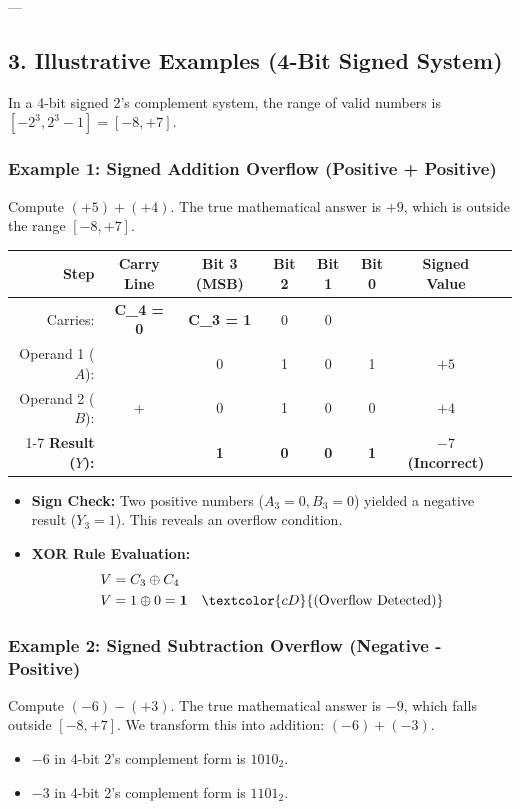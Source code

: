 \documentclass[12pt,a3paper]{article}
\begin{document}
\begin{enumerate}
\begin{tcolorbox}[enhanced,breakable,ansbox,colback=cD!4,colframe=cD,boxrule=0.8pt,arc=5pt,title={\textbf{Answer}},fonttitle=\bfseries\color{white},colbacktitle=cD]
---

\subsection*{3. Illustrative Examples (4-Bit Signed System)}
In a 4-bit signed 2's complement system, the range of valid numbers is $[-2^3, 2^3-1] = [-8, +7]$.

\subsubsection*{Example 1: Signed Addition Overflow (Positive + Positive)}
Compute $(+5) + (+4)$. The true mathematical answer is $+9$, which is outside the range $[ -8, +7 ]$.

\begin{center}
\renewcommand{\arraystretch}{1.1}
\begin{tabular}{rccccccl}
\toprule
\textbf{Step} & \textbf{Carry Line} & \textbf{Bit 3 (MSB)} & \textbf{Bit 2} & \textbf{Bit 1} & \textbf{Bit 0} & \textbf{Signed Value} \\
\midrule
Carries: & \textcolor{cD}{\textbf{C\_4 = 0}} & \textcolor{cD}{\textbf{C\_3 = 1}} & 0 & 0 & & \\
Operand 1 ($A$): & & 0 & 1 & 0 & 1 & $+5$ \\
Operand 2 ($B$): & + & 0 & 1 & 0 & 0 & $+4$ \\
\cmidrule{1-7}
\textbf{Result ($Y$):} & & \textbf{1} & \textbf{0} & \textbf{0} & \textbf{1} & \textbf{$-7$ (Incorrect)} \\
\bottomrule
\end{tabular}
\end{center}

\begin{itemize}
    \item \textbf{Sign Check:} Two positive numbers ($A_3=0, B_3=0$) yielded a negative result ($Y_3=1$). This reveals an overflow condition.
    \item \textbf{XOR Rule Evaluation:} 
    \begin{align*}
        V &= C_3 \oplus C_4 \\
        V &= 1 \oplus 0 = \mathbf{1} \quad \textcolor{cD}{\text{(Overflow Detected)}}
    \end{align*}
\end{itemize}

\subsubsection*{Example 2: Signed Subtraction Overflow (Negative - Positive)}
Compute $(-6) - (+3)$. The true mathematical answer is $-9$, which falls outside $[ -8, +7 ]$. 
We transform this into addition: $(-6) + (-3)$. 
\begin{itemize}
    \item $-6$ in 4-bit 2's complement form is $1010_2$.
    \item $-3$ in 4-bit 2's complement form is $1101_2$.
\end{itemize}


\end{tcolorbox}
\end{enumerate}
\end{document}
